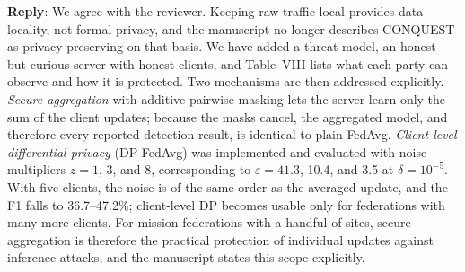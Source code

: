 \documentclass[11pt]{article}
\newcommand{\reply}{\noindent\textbf{Reply}: }
\begin{document}
\reply We agree with the reviewer. Keeping raw traffic local provides data
locality, not formal privacy, and the manuscript no longer describes
CONQUEST as privacy-preserving on that basis. We have added a threat model,
an honest-but-curious server with honest clients, and Table~VIII lists what
each party can observe and how it is protected. Two mechanisms are then
addressed explicitly. \textit{Secure aggregation} with additive pairwise
masking lets the server learn only the sum of the client updates; because the
masks cancel, the aggregated model, and therefore every reported detection
result, is identical to plain FedAvg. \textit{Client-level differential
privacy} (DP-FedAvg) was implemented and evaluated with noise multipliers
$z=1$, 3, and 8, corresponding to $\varepsilon=41.3$, 10.4, and 3.5 at
$\delta=10^{-5}$. With five clients, the noise is of the same order as the
averaged update, and the F1 falls to 36.7--47.2\%; client-level DP becomes
usable only for federations with many more clients. For mission federations
with a handful of sites, secure aggregation is therefore the practical
protection of individual updates against inference attacks, and the
manuscript states this scope explicitly.
\end{document}
